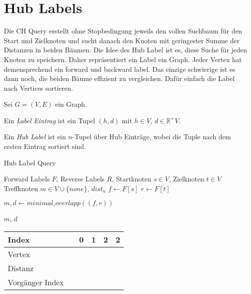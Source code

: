\chapter{Hub Labels}\label{chapter:hl}

Die CH Query erstellt ohne Stopbedingung jeweils den vollen Suchbaum für den Start und Zielknoten und sucht danach den Knoten mit geringester Summe der Distanzen in beiden Bäumen.
Die Idee des Hub Label ist es, diese Suche für jeden Knoten zu speichern.
Daher repräsentiert ein Label ein Graph.
Jeder Vertex hat demensprechend ein forward und backward label.
Das einzige schwierige ist es dann noch, die beiden Bäume effizient zu vergleichen.
Dafür einfach die Label nach Vertices sortieren.


\begin{definition}
    Sei $G = (V, E)$ ein Graph.

    Ein \emph{Label Eintrag} ist ein Tupel $(h, d)$ mit $h \in V$, $d \in \mathbb{R}^+V$.

    Ein \emph{Hub Label} ist ein $n$-Tupel über Hub Einträge, wobei die Tuple nach dem ersten Eintrag sortiert sind.
\end{definition}




\begin{algorithm}
    \caption{Hub Label Query}
    \begin{algorithmic}[1]
        \Require Forward Labels $F$, Reverse Labels $R$, Startknoten $s \in V$, Zielknoten $t \in V$
        \Ensure Treffknoten $m \in V \cup \{ {none} \}$, ${dist}_u$
        \State $f \leftarrow F[s]$
        \State $r \leftarrow F[t]$

        \State
        \State $m, d \leftarrow {minimal\_overlapp}((f, r))$

        \State
        \State \Return $m$, $d$
    \end{algorithmic}
\end{algorithm}

\begin{table}[]
    \centering
    \begin{tabular}{@{}llllll@{}}
        \toprule
        Index           &  & 0 & 1 & 2 & 2 \\ \midrule
        Vertex          &  &   &   &   &   \\
        Distanz         &  &   &   &   &   \\
        Vorgänger Index &  &   &   &   &   \\ \bottomrule
    \end{tabular}
\end{table}

